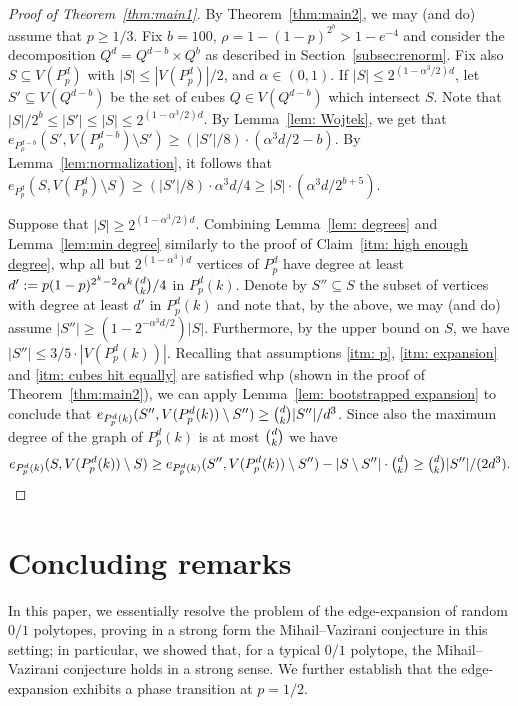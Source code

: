 \documentclass{article}
\theoremstyle{definition}
\begin{document}
\begin{proof}[Proof of Theorem~\ref{thm:main1}]
By Theorem~\ref{thm:main2}, we may (and do) assume that $p\geq 1/3$. 
Fix $b=100$, $\rho=  1-(1-p)^{2^b} > 1-e^{-4}$ and consider the decomposition $Q^d=Q^{d-b}\times Q^b$ as described in Section~\ref{subsec:renorm}. 
Fix also $S\subseteq V(P_p^d)$ with $|S|\leq |V(P_p^d)|/2$, and $\alpha\in (0,1)$. 
If $|S|\leq 2^{(1-\alpha^3/2)d}$, let $S'\subseteq V(Q^{d-b})$ be the set of cubes $Q\in V(Q^{d-b})$ which intersect $S$. 
Note that $|S|/2^b\leq|S'|\leq |S|\leq 2^{(1-\alpha^3/2)d}$. 
By Lemma~\ref{lem: Wojtek}, we get that $e_{P^{d-b}_\rho}(S',V(P^{d-b}_\rho)\setminus S')\geq (|S'|/8)\cdot (\alpha^3 d/2-b)$. 
By Lemma~\ref{lem:normalization}, it follows that $e_{P^{d}_p}(S,V(P^{d}_p)\setminus S)\geq (|S'|/8)\cdot \alpha^3 d/4\geq |S|\cdot (\alpha^3 d/2^{b+5})$.
    
Suppose that $|S|\geq 2^{(1-\alpha^3/2)d}$. Combining Lemma~\ref{lem: degrees} and Lemma~\ref{lem:min degree} similarly to the proof of Claim~\ref{itm: high enough degree}, whp all but $2^{(1-\alpha^3)d}$ vertices of $P_p^d$ have degree at least 
$d' := p(1-p)^{2^k-2} \alpha^k \tbinom{d}{k}/4$ in $P_p^d(k)$. 
Denote by $S''\subseteq S$ the subset of vertices with degree at least $d'$ in $P_p^d(k)$ and note that, by the above, we may (and do) assume $|S''|\geq (1-2^{-\alpha^3 d/2})|S|$. 
Furthermore, by the upper bound on $S$, we have $|S''|\leq 3/5\cdot |V(P^d_{p}(k))|$.
Recalling that assumptions \ref{itm: p}, \ref{itm: expansion} and \ref{itm: cubes hit equally} are satisfied whp (shown in the proof of Theorem~\ref{thm:main2}), we can apply Lemma~\ref{lem: bootstrapped expansion} to conclude that $e_{P^d_p(k)}(S'',V(P^d_p(k))\setminus S'')\geq \tbinom{d}{k}|S''|/d^3$. 
Since also the maximum degree of the graph of $P^d_p(k)$ is at most $\tbinom{d}{k}$ we have \[e_{P^d_p(k)}(S,V(P^d_p(k))\setminus S)\geq e_{P^d_p(k)}(S'',V(P^d_p(k))\setminus S'')-|S\setminus S''|\cdot \tbinom{d}{k}\ge \tbinom{d}{k} |S''|/(2d^3). \qedhere\]
\end{proof}

\section{Concluding remarks}
In this paper, we essentially resolve the problem of the edge-expansion of random $0/1$ polytopes, proving in a strong form the Mihail--Vazirani conjecture in this setting; 
in particular, we showed that, for a typical $0/1$ polytope, the Mihail--Vazirani conjecture holds in a strong sense. We further establish that the edge-expansion exhibits a phase transition at $p = 1/2$. 
\end{document}
